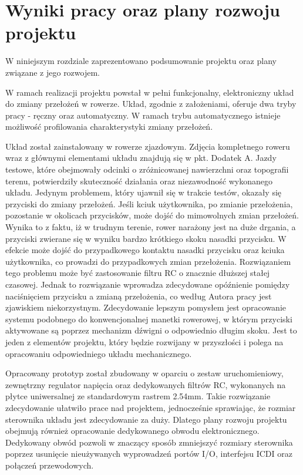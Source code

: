 \chapter{Wyniki pracy oraz plany rozwoju projektu}

W niniejszym rozdziale zaprezentowano podsumowanie projektu oraz plany związane z jego rozwojem. 

W ramach realizacji projektu powstał w pełni funkcjonalny, elektroniczny układ do zmiany przełożeń w rowerze. Układ, zgodnie z założeniami, oferuje dwa tryby pracy - ręczny oraz automatyczny. W ramach trybu automatycznego istnieje możliwość profilowania charakterystyki zmiany przełożeń.

Układ został zainstalowany w rowerze zjazdowym. Zdjęcia kompletnego roweru wraz z głównymi elementami układu znajdują się w pkt. Dodatek A. Jazdy testowe, które obejmowały odcinki o zróżnicowanej nawierzchni oraz topografii terenu, potwierdziły skuteczność działania oraz niezawodność wykonanego układu. Jedynym problemem, który ujawnił się w trakcie testów, okazały się przyciski do zmiany przełożeń. Jeśli kciuk użytkownika, po zmianie przełożenia, pozostanie w okolicach przycisków, może dojść do mimowolnych zmian przełożeń. Wynika to z faktu, iż w trudnym terenie, rower narażony jest na duże drgania, a przyciski zwierane się w wyniku bardzo krótkiego skoku nasadki przycisku. W efekcie może dojść do przypadkowego kontaktu nasadki przycisku oraz kciuka użytkownika, co prowadzi do przypadkowych zmian przełożenia. Rozwiązaniem tego problemu może być zastosowanie filtru RC o znacznie dłuższej stałej czasowej. Jednak to rozwiązanie wprowadza zdecydowane opóźnienie pomiędzy naciśnięciem przycisku a zmianą przełożenia, co według Autora pracy jest zjawiskiem niekorzystnym. Zdecydowanie lepszym pomysłem jest opracowanie systemu podobnego do konwencjonalnej manetki rowerowej, w którym przyciski aktywowane są poprzez mechanizm dźwigni o odpowiednio długim skoku. Jest to jeden z elementów projektu, który będzie rozwijany w przyszłości i polega na opracowaniu odpowiedniego układu mechanicznego.

Opracowany prototyp został zbudowany w oparciu o zestaw uruchomieniowy, zewnętrzny regulator napięcia oraz dedykowanych filtrów RC, wykonanych na płytce uniwersalnej ze standardowym rastrem 2.54mm. Takie rozwiązanie zdecydowanie ułatwiło prace nad projektem, jednocześnie sprawiając, że rozmiar sterownika układu jest zdecydowanie za duży. Dlatego plany rozwoju projektu obejmują również opracowanie dedykowanego obwodu elektronicznego. Dedykowany obwód pozwoli w znaczący sposób zmniejszyć rozmiary sterownika poprzez usunięcie nieużywanych wyprowadzeń portów I/O, interfejsu ICDI oraz połączeń przewodowych.

